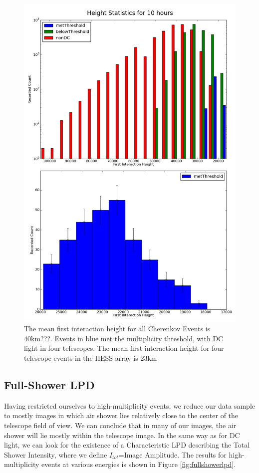 \documentclass{article}
\begin{document}
\begin{figure}
\begin{center}
\includegraphics[height=0.9\textheight]{hessheight}
\caption{The mean first interaction height for all Cherenkov Events is 40km???. Events in blue met the multiplicity threshold, with DC light in four telescopes. The mean first interaction height for four telescope events in the HESS array is 23km}
\label{fig:Hessheight}
\end{center}
\end{figure}

\subsection{Full-Shower LPD}
Having restricted ourselves to high-multiplicity events, we reduce our data sample to mostly images in which air shower lies relatively close to the center of the telescope field of view. We can conclude that in many of our images, the air shower will lie mostly within the telescope image. In the same way as for DC light, we can look for the existence of a Characteristic LPD describing the Total Shower Intensity, where we define $I_{tot}$=Image Amplitude. The results for high-multiplicity events at various energies is shown in Figure \ref{fig:fullshowerlpd}.
\end{document}
